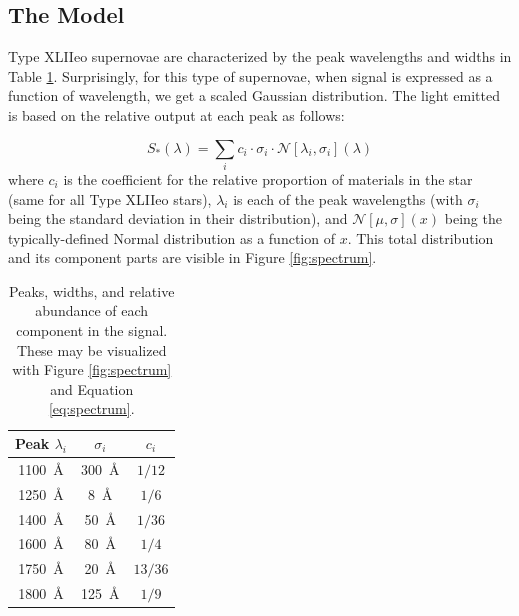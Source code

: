\documentclass{article}
\begin{document}
\subsection{The Model}
\label{sec:hmodel}
Type XLIIeo supernovae are characterized by the peak wavelengths and widths in Table \ref{tab:peaks}. Surprisingly, for
this type of supernovae, when signal is expressed as a function of wavelength, we get a scaled Gaussian distribution. The
light emitted is based on the relative output at each peak as follows:

\begin{equation}
\label{eq:spectrum}
S_{*}(\lambda)=\sum_i c_i\cdot \sigma_i \cdot\mathcal{N}[\lambda_i, \sigma_i](\lambda)
\end{equation}
where $c_i$ is the coefficient for the relative proportion of materials in the star (same for all Type XLIIeo stars),
$\lambda_i$ is each of the peak wavelengths (with $\sigma_i$ being the standard deviation in their distribution),
and $\mathcal{N}[\mu,\sigma](x)$ being the typically-defined Normal distribution as a function of $x$. This total distribution
and its component parts are visible in Figure \ref{fig:spectrum}.

\begin{table}
\begin{centering}
\begin{tabular}{|c|c|c|}
Peak $\lambda_i$ & $\sigma_i$ & $c_i$\\
\hline
\SI{1100}{\angstrom} & \SI{300}{\angstrom} & $1/12$\\
\SI{1250}{\angstrom} & \SI{8}{\angstrom}  & $1/6$\\
\SI{1400}{\angstrom} & \SI{50}{\angstrom} & $1/36$\\
\SI{1600}{\angstrom} & \SI{80}{\angstrom} & $1/4$\\
\SI{1750}{\angstrom} & \SI{20}{\angstrom} & $13/36$\\
\SI{1800}{\angstrom} & \SI{125}{\angstrom} & $1/9$
\end{tabular}
\caption{Peaks, widths, and relative abundance of each component in the signal. These may be visualized with Figure
\ref{fig:spectrum} and Equation \ref{eq:spectrum}.}
\label{tab:peaks}
\end{centering}
\end{table}
\end{document}
